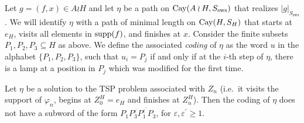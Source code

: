 \begin{defin}
	 Let $g=(f,x)\in A\wr H$ and let $\eta$ be a path on $\mathrm{Cay}(A\wr H,S_{\mathrm{sws}})$ that realizes $|g|_{S_{\mathrm{sws}}}$. We will identify $\eta$ with a path of minimal length on $\mathrm{Cay}(H,S_H)$ that starts at $e_H$, visits all elements in $\mathrm{supp}(f)$, and finishes at $x$. Consider the finite subsets $P_1,P_2,P_3\subseteq H$ as above. We define the associated \emph{coding} of $\eta$ as the word $u$ in the alphabet $\{P_1,P_2,P_3\}$, such that $u_i=P_j$ if and only if at the $i$-th step of $\eta$, there is a lamp at a position in $P_j$ which was modified for the first time.
\end{defin}

\begin{lem}\label{lem: groceries lemma p1p3p1p3}
	Let $\eta$ be a solution to the TSP problem associated with $Z_n$ (i.e.\ it visits the support of $\varphi_n$, begins at $Z_0^H=e_H$ and finishes at $Z_n^H$). Then the coding of $\eta$ does not have a subword of the form $P_1P_3^{\varepsilon}P_1^{\varepsilon^{\prime }}P_3$, for $\varepsilon, \varepsilon^{\prime}\ge 1$.
\end{lem}
